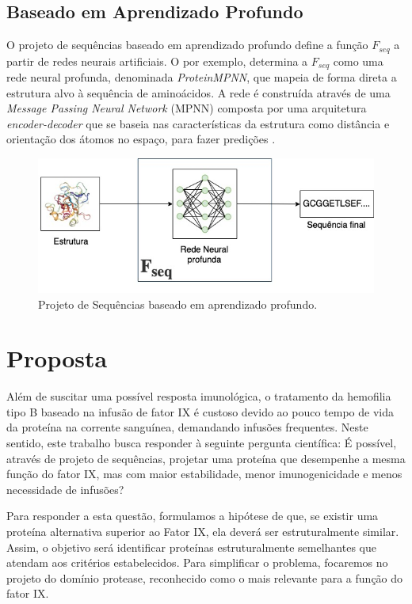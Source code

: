 \subsection{Baseado em Aprendizado Profundo}

O projeto de sequências baseado em aprendizado profundo define a função $F_{seq}$ 
a partir de redes neurais artificiais. 
O \cite{ProteinMPNN} por exemplo, 
determina a $F_{seq}$ como uma rede neural profunda, denominada \textit{ProteinMPNN}, 
que mapeia de forma direta a estrutura alvo à sequência de aminoácidos. 
A rede é construída através de uma \textit{Message Passing Neural Network} (MPNN) 
composta por uma arquitetura \textit{encoder-decoder} 
que se baseia nas características da estrutura como distância e orientação dos átomos no espaço, 
para fazer predições \cite{ProteinMPNN}. 

\begin{figure}[H]
  \centering
  \includegraphics[width=.8\textwidth]{figuras/metodologia-DeepLearningBased.jpg}
  \caption{Projeto de Sequências baseado em aprendizado profundo.}
\end{figure}

\section{Proposta}
\label{section:Proposta}

Além de suscitar uma possível resposta imunológica, 
o tratamento da hemofilia tipo B baseado na infusão de fator IX
é custoso devido ao pouco tempo de vida da proteína na corrente sanguínea, demandando infusões frequentes. 
Neste sentido, este trabalho busca responder à seguinte pergunta científica: 
É possível, através de projeto de sequências, projetar uma proteína que desempenhe a mesma função do fator IX, 
mas com maior estabilidade, menor imunogenicidade e menos necessidade de infusões?

Para responder a esta questão, formulamos a hipótese de que, 
se existir uma proteína alternativa superior ao Fator IX, 
ela deverá ser estruturalmente similar. 
Assim, o objetivo será identificar proteínas estruturalmente semelhantes que atendam aos critérios estabelecidos.
Para simplificar o problema, focaremos no projeto do domínio protease, 
reconhecido como o mais relevante para a função do fator IX.

